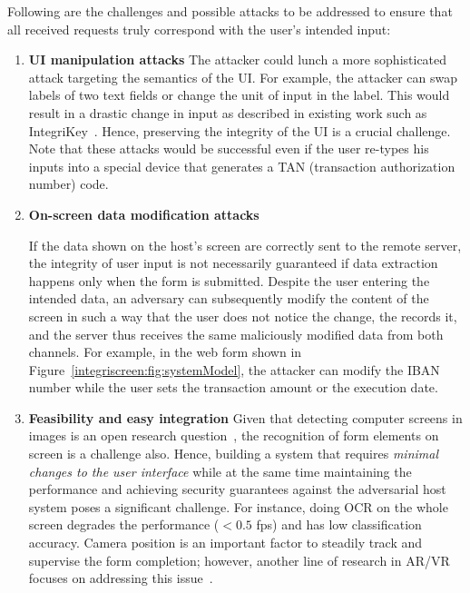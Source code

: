 Following are the challenges and possible attacks to be addressed to ensure that all received requests truly correspond with the user's intended input:

\begin{enumerate}

\item \textbf{UI manipulation attacks}
The attacker could lunch a more sophisticated attack targeting the semantics of the UI. For example, the attacker can swap labels of two text fields or change the unit of input in the label. This would result in a drastic change in input as described in existing work such as IntegriKey~\cite{integrikey}. Hence, preserving the integrity of the UI is a crucial challenge. Note that these attacks would be successful even if the user re-types his inputs into a special device that generates a TAN (transaction authorization number) code.


\item \textbf{On-screen data modification attacks}

If the data shown on the host's screen are correctly sent to the remote server, the integrity of user input is not necessarily guaranteed if data extraction happens only when the form is submitted.
Despite the user entering the intended data, an adversary can subsequently modify the content of the screen in such a way that the user does not notice the change, the \app records it, and the server thus receives the same maliciously modified data from both channels. For example, in the web form shown in Figure~\ref{integriscreen:fig:systemModel}, the attacker can modify the IBAN number while the user sets the transaction amount or the execution date. 

 

\item \textbf{Feasibility and easy integration}
Given that detecting computer screens in images is an open research question~\cite{detectingScreens}, the recognition of form elements on screen is a challenge also. Hence, building a system that requires \emph{minimal changes to the user interface} while at the same time maintaining the performance and achieving security guarantees against the adversarial host system poses a significant challenge. For instance, doing OCR on the whole screen degrades the performance ($<0.5$ fps) and has low classification accuracy. Camera position is an important factor to steadily track and supervise the form completion; however, another line of research in AR/VR focuses on addressing this issue~\cite{objectDetectionMobicom19, objectDetectionNIPS15, objectDetectionBD18}.

\end{enumerate}

